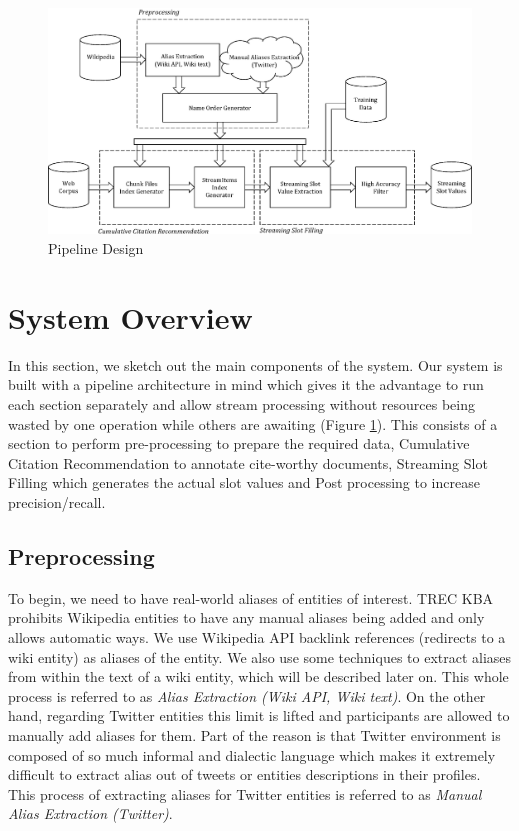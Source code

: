
\begin{figure}
\centering
\includegraphics[width=6in]{./images/SystemBW.eps}
\vspace*{-.1in} \caption{Pipeline Design }\label{fig:system}
\vspace*{-.2in}
\end{figure}

\section{System Overview}

In this section, we sketch out the main components of the system. Our system is built with a pipeline architecture in mind which gives it the advantage to run each section separately and allow stream processing without resources being wasted by one operation while others are awaiting (Figure \ref{fig:system}). This consists of a section to perform pre-processing to prepare the required data, Cumulative Citation Recommendation to annotate cite-worthy documents, Streaming Slot Filling which generates the actual slot values and Post processing to increase precision/recall. 


\subsection{Preprocessing}

To begin, we need to have real-world aliases of entities of interest. TREC KBA prohibits Wikipedia entities to have any manual aliases being added and only allows automatic ways. We use Wikipedia API backlink references (redirects to a wiki entity) as aliases of the entity. We also use some techniques to extract  aliases from within the text of a wiki entity, which will be described later on. This whole process is referred to as \textit{Alias Extraction (Wiki API, Wiki text)}. On the other hand, regarding Twitter entities this limit is lifted and participants are allowed to manually add aliases for them. Part of the reason is that Twitter environment is composed of so much informal and dialectic language which makes it extremely difficult to extract alias out of tweets or entities descriptions in their profiles. This process of extracting aliases for Twitter entities is referred to as \textit{Manual Alias Extraction (Twitter)}.

